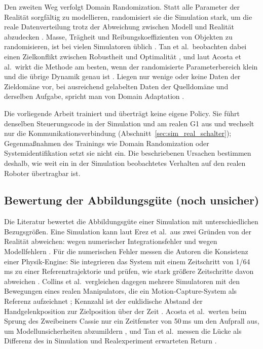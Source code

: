 Den zweiten Weg verfolgt Domain Randomization.
Statt alle Parameter der Realität sorgfältig zu modellieren, randomisiert sie die Simulation stark, um die reale Datenverteilung trotz der Abweichung zwischen Modell und Realität abzudecken \cite{Zhao2020}.
Masse, Trägheit und Reibungskoeffizienten von Objekten zu randomisieren, ist bei vielen Simulatoren üblich \cite{Collins2021}.
Tan et al.\ beobachten dabei einen Zielkonflikt zwischen Robustheit und Optimalität \cite{Tan2018}, und laut Acosta et al.\ wirkt die Methode am besten, wenn der randomisierte Parameterbereich klein und die übrige Dynamik genau ist \cite{Acosta2022}.
Liegen nur wenige oder keine Daten der Zieldomäne vor, bei ausreichend gelabelten Daten der Quelldomäne und derselben Aufgabe, spricht man von Domain Adaptation \cite{Zhao2020}.

Die vorliegende Arbeit trainiert und überträgt keine eigene Policy.
Sie führt denselben Steuerungscode in der Simulation und am realen G1 aus und wechselt nur die Kommunikationsverbindung (Abschnitt~\ref{sec:sim_real_schalter}); Gegenmaßnahmen des Trainings wie Domain Randomization oder Systemidentifikation setzt sie nicht ein.
Die beschriebenen Ursachen bestimmen deshalb, wie weit ein in der Simulation beobachtetes Verhalten auf den realen Roboter übertragbar ist.

\subsection{Bewertung der Abbildungsgüte (noch unsicher)}
\label{sec:abbildungsguete}
Die Literatur bewertet die Abbildungsgüte einer Simulation mit unterschiedlichen Bezugsgrößen.
Eine Simulation kann laut Erez et al.\ aus zwei Gründen von der Realität abweichen: wegen numerischer Integrationsfehler und wegen Modellfehlern \cite{Erez2015}.
Für die numerischen Fehler messen die Autoren die Konsistenz einer Physik-Engine: Sie integrieren das System mit einem Zeitschritt von 1/64\,ms zu einer Referenztrajektorie und prüfen, wie stark größere Zeitschritte davon abweichen \cite{Erez2015}.
Collins et al.\ vergleichen dagegen mehrere Simulatoren mit den Bewegungen eines realen Manipulators, die ein Motion-Capture-System als Referenz aufzeichnet \cite{Collins2019}; Kennzahl ist der euklidische Abstand der Handgelenkposition zur Zielposition über der Zeit \cite{Collins2019}.
Acosta et al.\ werten beim Sprung des Zweibeiners Cassie nur ein Zeitfenster von 50\,ms um den Aufprall aus, um Modellunsicherheiten abzumildern \cite{Acosta2022}, und Tan et al.\ messen die Lücke als Differenz des in Simulation und Realexperiment erwarteten Return \cite{Tan2018}.

